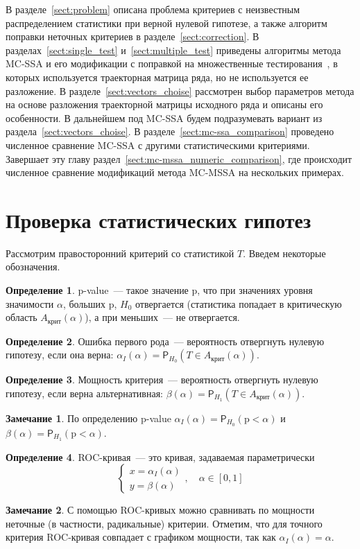 \documentclass[specialist,
substylefile = spbu.rtx,
               subf,href,colorlinks=true,12pt]{disser}
\theoremstyle{definition}
\newtheorem{definition}{Определение}
\newtheorem{remark}{Замечание}
\begin{document}
В разделе~\ref{sect:problem} описана проблема критериев с неизвестным распределением статистики при верной нулевой гипотезе, а также алгоритм поправки неточных критериев в разделе~\ref{sect:correction}. В разделах~\ref{sect:single_test} и~\ref{sect:multiple_test} приведены алгоритмы метода MC-SSA и его модификации с поправкой на множественные тестирования~\cite{Golyandina2023}, в которых используется траекторная матрица ряда, но не используется ее разложение. В разделе~\ref{sect:vectors_choise} рассмотрен выбор параметров метода на основе разложения траекторной матрицы исходного ряда и описаны его особенности. В дальнейшем под MC-SSA будем подразумевать вариант из раздела~\ref{sect:vectors_choise}. В разделе~\ref{sect:mc-ssa_comparison} проведено численное сравнение MC-SSA с другими статистическими критериями. Завершает эту главу раздел~\ref{sect:mc-mssa_numeric_comparison}, где происходит численное сравнение модификаций метода MC-MSSA на нескольких примерах.

\section{Проверка статистических гипотез}\label{sect:hypothesis}
Рассмотрим правосторонний критерий со статистикой $T$. Введем некоторые обозначения.
\begin{definition}
	p-value~--- такое значение $\mathrm p$, что при значениях уровня значимости $\alpha$, больших $\mathrm p$, $H_0$ отвергается (статистика попадает в критическую область $A_\text{крит}(\alpha)$), а при меньших~--- не отвергается.
\end{definition}
\begin{definition}
	Ошибка первого рода~--- вероятность отвергнуть нулевую гипотезу, если она верна: $\alpha_I(\alpha)=\mathsf P_{H_0}(T\in A_\text{крит}(\alpha))$.
\end{definition}
\begin{definition}
	Мощность критерия~--- вероятность отвергнуть нулевую гипотезу, если верна альтернативная: $\beta(\alpha)=\mathsf P_{H_1}(T\in A_\text{крит}(\alpha))$.
\end{definition}
\begin{remark}
	По определению p-value $\alpha_I(\alpha)=\mathsf P_{H_0}(\mathrm p < \alpha)$ и $\beta(\alpha)=\mathsf P_{H_1}(\mathrm p < \alpha)$.
\end{remark}
\begin{definition}
	ROC-кривая~--- это кривая, задаваемая параметрически
	\[
		\begin{cases}
			x=\alpha_I(\alpha) \\
			y=\beta(\alpha)
		\end{cases},\quad \alpha\in[0,1]
	\]
\end{definition}
\begin{remark}
	С помощью ROC-кривых можно сравнивать по мощности неточные (в частности, радикальные) критерии. Отметим, что для точного критерия ROC-кривая совпадает с графиком мощности, так как $\alpha_I(\alpha)=\alpha$.
\end{remark}
\end{document}
